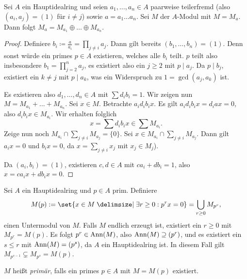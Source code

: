 \documentclass[12pt,a4paper]{scrartcl}
\theoremstyle{cplain}
\theoremstyle{cdef}
\begin{document}
\begin{lem} \label{lem:zerlegung ueber hir}
	Sei $A$ ein Hauptidealring und seien $a_1,\dots, a_n\in A$ paarweise teilerfremd (also $(a_i, a_j) = (1)$ für $i \neq j$) sowie $a = a_1\dots a_n$. Sei $M$ der $A$-Modul mit $M = M_a$. Dann folgt $M_a = M_{a_1}\oplus \dots \oplus M_{a_n}$.
\end{lem}
\begin{proof}
	Definiere $b_i \coloneqq \frac{a}{a_i} = \prod_{j\neq i} a_j$. Dann gilt bereits $(b_1,\dots, b_n) = (1)$. Denn sonst würde ein primes $p\in A$ existieren, welches alle $b_i$ teilt. $p$ teilt also insbesondere $b_1 = \prod_{j = 2}^n a_j$, es existiert also ein $j\geq 2$ mit $p \mid a_j$. Da $p \mid b_j$, existiert ein $k\neq j$ mit $p \mid a_k$, was ein Widerspruch zu $1 = \gcd(a_j,a_k)$ ist.
	
	Es existieren also $d_1,\dots, d_n\in A$ mit $\sum d_ib_i = 1$. Wir zeigen nun $M = M_{a_1}+\dots +M_{a_n}$. Sei $x\in M$. Betrachte $a_id_ib_ix$. Es gilt $a_id_ib_ix = d_iax = 0$, also $d_ib_ix\in M_{a_i}$. Wir erhalten folglich \[ x = \sum d_ib_ix \in \sum M_{a_i}. \]
	Zeige nun noch $M_{a_i}\cap \sum_{j\neq i}M_{a_j} = \{0\}$. Sei $x\in M_{a_i}\cap\sum_{j \neq i}M_{a_j}$. Dann gilt $a_ix = 0$ und $b_ix = 0$, da $x = \sum_{j \neq i} x_j$ mit $x_j\in M_j$).
	
	Da $(a_i,b_i)= (1)$, existieren $c,d\in A$ mit $ca_i+db_i = 1$, also $x = ca_ix+db_ix = 0$.
\end{proof}

\begin{defi}
	Sei $A$ ein Hauptidealring und $p\in A$ prim. Definiere
	\[M(p) := \set{x\in M \given \exists r\geq 0: p^rx = 0} = \bigcup\limits_{r\geq 0} M_{p^r}, \]
	einen Untermodul von $M$. Falls $M$ endlich erzeugt ist, existiert ein $r\geq 0$ mit $M_{p^r} = M(p)$. Es folgt $p^r\in \operatorname{Ann}(M)$, also $\operatorname{Ann}(M)\supseteq (p^r)$, und es existiert ein $s\leq r$ mit $\operatorname{Ann}(M) = (p^s)$, da $A$ ein Hauptidealring ist. In diesem Fall gilt $M_{p^{s-1}}\subsetneq M_{p^s} = M(p)$.
	
	$M$ heißt \emph{primär}, falls ein primes $p\in A$ mit $M = M(p)$ existiert.
\end{defi}	
\end{document}
